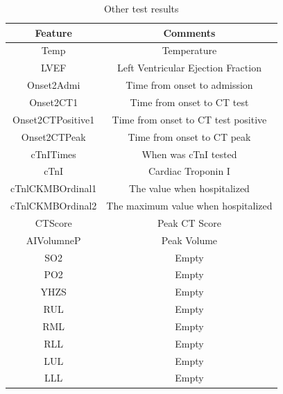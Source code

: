 \begin{table}[H]
\centering
\begin{tabular}{@{}cc@{}}
\toprule
Feature                   & Comments  \\ 
\toprule
Temp & Temperature \\
LVEF & Left Ventricular Ejection Fraction\\
Onset2Admi & Time from onset to admission \\
Onset2CT1 & Time from onset to CT test\\
Onset2CTPositive1 & Time from onset to CT test positive \\
Onset2CTPeak & Time from onset to CT peak \\
cTnITimes &	When was cTnI tested  \\
cTnI & Cardiac Troponin I	 \\
cTnlCKMBOrdinal1  & The value when hospitalized	 \\
cTnlCKMBOrdinal2 & The maximum value when hospitalized \\
CTScore & Peak CT Score  \\
AIVolumneP & Peak Volume \\
SO2 & Empty \\
PO2 & Empty  \\
YHZS & Empty\\
RUL & Empty \\
RML & Empty  \\
RLL & Empty  \\
LUL & Empty  \\
LLL & Empty \\
\bottomrule
\end{tabular}
\caption{Other test results}
\end{table}
